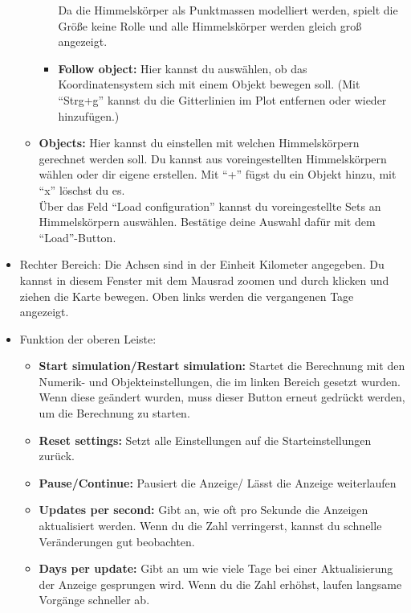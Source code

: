 \documentclass{scrartcl}
\begin{document}
\begin{itemize}[leftmargin=*]
\begin{itemize}
\begin{itemize}
                    Da die Himmelskörper als Punktmassen modelliert werden, spielt die Größe keine Rolle und alle Himmelskörper werden gleich groß angezeigt.
                    \item \textbf{Follow object:} Hier kannst du auswählen, ob das Koordinatensystem sich mit einem Objekt bewegen soll.
                    (Mit "`Strg+g"' kannst du die Gitterlinien im Plot entfernen oder wieder hinzufügen.)
                    \end{itemize}
                    \item \textbf{Objects:} Hier kannst du einstellen mit welchen Himmelskörpern gerechnet werden soll. Du kannst aus voreingestellten Himmelskörpern wählen oder dir eigene erstellen. 
                    Mit "`+"' fügst du ein Objekt hinzu, mit "`{\sffamily x}"' löschst du es.\\
                    Über das Feld "`Load configuration"' kannst du voreingestellte Sets an Himmelskörpern auswählen. Bestätige deine Auswahl dafür mit dem "`Load"'-Button.
                \end{itemize}
            \item Rechter Bereich:  
                Die Achsen sind in der Einheit Kilometer angegeben. 
                Du kannst in diesem Fenster mit dem Mausrad zoomen und durch klicken und ziehen die Karte bewegen.
                Oben links werden die vergangenen Tage angezeigt.
            \item Funktion der oberen Leiste:
                \begin{itemize}
                    \item \textbf{Start simulation/Restart simulation:} Startet die Berechnung mit den Numerik- und Objekteinstellungen, die im linken Bereich gesetzt wurden.
                    Wenn diese geändert wurden, muss dieser Button erneut gedrückt werden, um die Berechnung zu starten.
                    \item \textbf{Reset settings:} Setzt alle Einstellungen auf die Starteinstellungen zurück.
                    \item \textbf{Pause/Continue:} Pausiert die Anzeige/ Lässt die Anzeige weiterlaufen
                    \item \textbf{Updates per second:} Gibt an, wie oft pro Sekunde die Anzeigen aktualisiert werden. 
                            Wenn du die Zahl verringerst, kannst du schnelle Veränderungen gut beobachten.
                    \item \textbf{Days per update:} Gibt an um wie viele Tage bei einer Aktualisierung der Anzeige gesprungen wird.
                            Wenn du die Zahl erhöhst, laufen langsame Vorgänge schneller ab.
                \end{itemize}
        \end{itemize}
        
\end{document}
